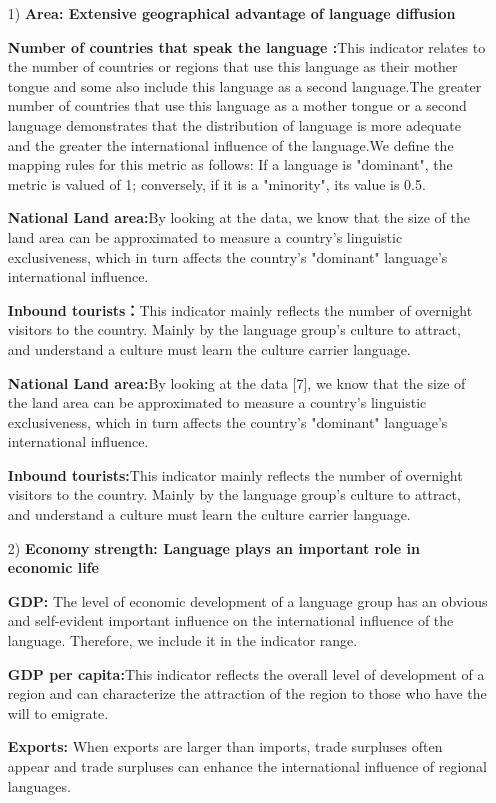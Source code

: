 \begin{enumerate}
	\item[1)] \textbf{Area: Extensive geographical advantage of language diffusion}
	\par \textbf{Number of countries that speak the language :}This indicator relates to the number of countries or regions that use this language as their mother tongue and some also include this language as a second language.The greater number of countries that use this language as a mother tongue or a second language demonstrates that the distribution of language is more adequate and the greater the international influence of the language.We define the mapping rules for this metric as follows: If a language is "dominant", the metric is valued of 1; conversely, if it is a "minority", its value is 0.5.
	\par \textbf{National Land area:}By looking at the data, we know that the size of the land area can be approximated to measure a country's linguistic exclusiveness, which in turn affects the country's "dominant" language's international influence.
	\par \textbf{Inbound tourists：}This indicator mainly reflects the number of overnight visitors to the country. Mainly by the language group's culture to attract, and understand a culture must learn the culture carrier language.
	\par \textbf{National Land area:}By looking at the data [7], we know that the size of the land area can be approximated to measure a country's linguistic exclusiveness, which in turn affects the country's "dominant" language's international influence.
	\par \textbf{Inbound tourists:}This indicator mainly reflects the number of overnight visitors to the country. Mainly by the language group's culture to attract, and understand a culture must learn the culture carrier  language.
	
	\item[2)] \textbf{Economy strength: Language plays an important role in economic life}
	\par \textbf{GDP: }The level of economic development of a language group has an obvious and self-evident important influence on the international influence of the language. Therefore, we include it in the indicator range.
	\par \textbf{GDP per capita:}This indicator reflects the overall level of development of a region and can characterize the attraction of the region to those who have the will to emigrate.
	\par \textbf{Exports: }When exports are larger than imports, trade surpluses often appear and trade surpluses can enhance the international influence of regional languages.
	

\end{enumerate}
